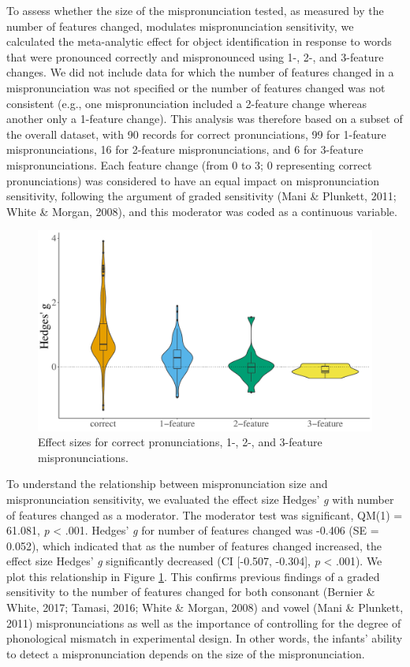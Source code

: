 \documentclass[man]{apa6}
\begin{document}
To assess whether the size of the mispronunciation tested, as measured by the number of features changed, modulates mispronunciation sensitivity, we calculated the meta-analytic effect for object identification in response to words that were pronounced correctly and mispronounced using 1-, 2-, and 3-feature changes. We did not include data for which the number of features changed in a mispronunciation was not specified or the number of features changed was not consistent (e.g., one mispronunciation included a 2-feature change whereas another only a 1-feature change). This analysis was therefore based on a subset of the overall dataset, with 90 records for correct pronunciations, 99 for 1-feature mispronunciations, 16 for 2-feature mispronunciations, and 6 for 3-feature mispronunciations. Each feature change (from 0 to 3; 0 representing correct pronunciations) was considered to have an equal impact on mispronunciation sensitivity, following the argument of graded sensitivity (Mani \& Plunkett, 2011; White \& Morgan, 2008), and this moderator was coded as a continuous variable.

\begin{figure}
\centering
\includegraphics{VonHolzenBergmann_MPMetaAnalysis_files/figure-latex/PlotFeatEffect-1.pdf}
\caption{\label{fig:PlotFeatEffect}Effect sizes for correct pronunciations, 1-, 2-, and 3-feature mispronunciations.}
\end{figure}

To understand the relationship between mispronunciation size and mispronunciation sensitivity, we evaluated the effect size Hedges' \emph{g} with number of features changed as a moderator. The moderator test was significant, QM(1) = 61.081, \emph{p} \textless{} .001. Hedges' \emph{g} for number of features changed was -0.406 (SE = 0.052), which indicated that as the number of features changed increased, the effect size Hedges' \emph{g} significantly decreased (CI {[}-0.507, -0.304{]}, \emph{p} \textless{} .001). We plot this relationship in Figure \ref{fig:PlotFeatEffect}. This confirms previous findings of a graded sensitivity to the number of features changed for both consonant (Bernier \& White, 2017; Tamasi, 2016; White \& Morgan, 2008) and vowel (Mani \& Plunkett, 2011) mispronunciations as well as the importance of controlling for the degree of phonological mismatch in experimental design. In other words, the infants' ability to detect a mispronunciation depends on the size of the mispronunciation.
\end{document}
